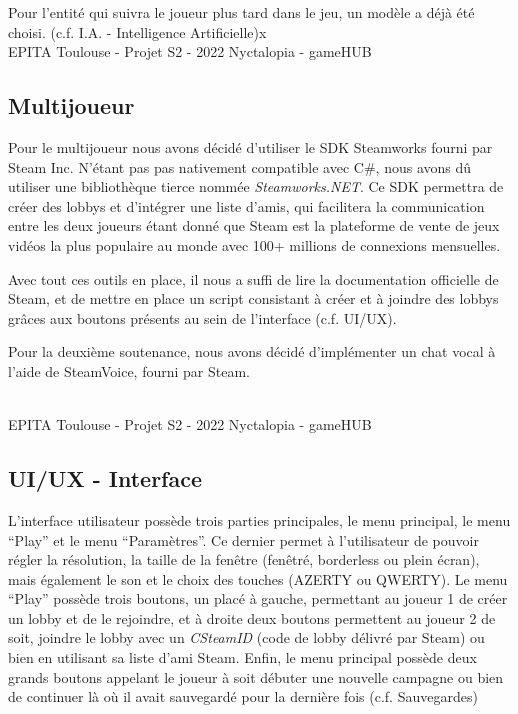 Pour l'entité qui suivra le joueur plus tard dans le jeu, un modèle a déjà été choisi. (c.f. I.A. - Intelligence Artificielle)x
\vfill
\noindent\makebox[\linewidth]{\rule{.8\paperwidth}{.6pt}}\\[0.2cm]
EPITA Toulouse - Projet S2 - 2022 \hfill Nyctalopia - gameHUB
\noindent\makebox[\linewidth]{\rule{.8\paperwidth}{.6pt}}
\newpage



\subsection{Multijoueur}
\setlength{\parindent}{5ex}
Pour le multijoueur nous avons décidé d'utiliser le SDK Steamworks fourni par Steam Inc. N'étant pas pas nativement compatible avec C\#, nous avons dû utiliser une bibliothèque tierce nommée {\emph{Steamworks.NET}}. Ce SDK permettra de créer des lobbys et d'intégrer une liste d'amis, qui facilitera la communication entre les deux joueurs étant donné que Steam est la plateforme de vente de jeux vidéos la plus populaire au monde avec 100+ millions de connexions mensuelles.

Avec tout ces outils en place, il nous a suffi de lire la documentation officielle de Steam, et de mettre en place un script consistant à créer et à joindre des lobbys grâces aux boutons présents au sein de l'interface (c.f. UI/UX).

Pour la deuxième soutenance, nous avons décidé d'implémenter un chat vocal à l'aide de SteamVoice, fourni par Steam.

\vfill
\noindent\makebox[\linewidth]{\rule{.8\paperwidth}{.6pt}}\\[0.2cm]
EPITA Toulouse - Projet S2 - 2022 \hfill Nyctalopia - gameHUB
\noindent\makebox[\linewidth]{\rule{.8\paperwidth}{.6pt}}
\newpage

\subsection{UI/UX - Interface}
\setlength{\parindent}{5ex}
L'interface utilisateur possède trois parties principales, le menu principal, le menu ``Play'' et le menu ``Paramètres''. Ce dernier permet à l'utilisateur de pouvoir régler la résolution, la taille de la fenêtre (fenêtré, borderless ou plein écran), mais également le son et le choix des touches (AZERTY ou QWERTY).
Le menu ``Play'' possède trois boutons, un placé à gauche, permettant au joueur 1 de créer un lobby et de le rejoindre, et à droite deux boutons permettent au joueur 2 de soit, joindre le lobby avec un \emph{CSteamID} (code de lobby délivré par Steam) ou bien en utilisant sa liste d'ami Steam.
Enfin, le menu principal possède deux grands boutons appelant le joueur à soit débuter une nouvelle campagne ou bien de continuer là où il avait sauvegardé pour la dernière fois (c.f. Sauvegardes)

